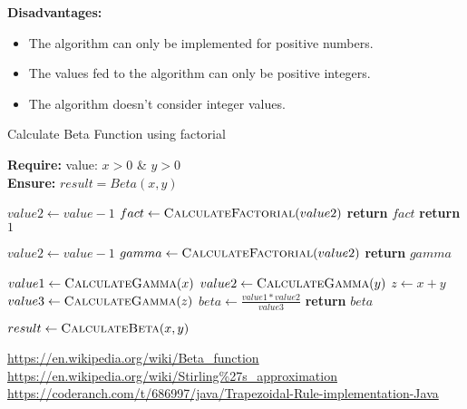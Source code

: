 \documentclass{report}
\begin{document}
\textbf{Disadvantages:}
\begin{itemize}
    \item The algorithm can only be implemented for positive numbers.
    \item The values fed to the algorithm can only be positive integers.
    \item The algorithm doesn't consider integer values.
\end{itemize}
\begin{algorithm}
\caption{Calculate Beta Function using factorial}

\textbf{Require:}  value: $x > 0$ \& $y>0$  \\
\textbf{Ensure:} $result = Beta(x,y)$
\begin{algorithmic}[1]

    \State $value2 \leftarrow value-1$
    \State $fact \leftarrow \Call{CalculateFactorial}{value2}$
    \State \textbf{return} $fact$
    \Else
    \State \textbf{return} $1$
    \EndIf
    \EndProcedure
\Statex


    \State $value2 \leftarrow value-1$
    \State $gamma \leftarrow \Call{CalculateFactorial}{value2}$
    \State \textbf{return} $gamma$
    \EndProcedure
\Statex

    \State $value1 \leftarrow \Call{CalculateGamma}{x}$
    \State $value2 \leftarrow \Call{CalculateGamma}{y}$
    \State $z \leftarrow x+y$
    \State $value3 \leftarrow \Call{CalculateGamma}{z}$
    \State $beta \leftarrow \frac{value1 * value2}{value3}$
    \State \textbf{return} $beta$
    \EndProcedure
\Statex



\State $result \leftarrow \Call{CalculateBeta}{x,y} $

\end{algorithmic}
\end{algorithm}

    
\begin{thebibliography}{9}
\url{https://en.wikipedia.org/wiki/Beta\_function}\\
\url{https://en.wikipedia.org/wiki/Stirling\%27s\_approximation}\\
\url{https://coderanch.com/t/686997/java/Trapezoidal-Rule-implementation-Java}

\end{thebibliography}
    
    
\end{document}
